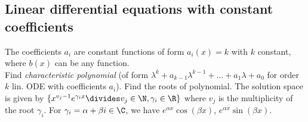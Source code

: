 \newsectionNoPB
\subsection{Linear differential equations with constant coefficients}
The coefficients $a_i$ are constant functions of form $a_i(x) = k$ with $k$ constant, where $b(x)$ can be any function.\\
%
 Find \textit{characteristic polynomial} (of form $\lambda^k + a_{k - 1} \lambda^{k - 1} + \ldots + a_1 \lambda + a_0$ for order $k$ lin. ODE with coefficients $a_i$).
Find the roots of polynomial. The solution space is given by $\{ x^{v_j - 1} e^{\gamma_i x} \divides v_j \in \N, \gamma_i \in \R \}$ where $v_j$ is the multiplicity of the root $\gamma_i$.
For $\gamma_i = \alpha + \beta i \in \C$, we have $e^{\alpha x}\cos(\beta x)$, $e^{\alpha x}\sin(\beta x)$.
